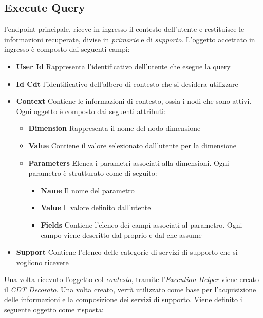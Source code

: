 \subsection{Execute Query\label{sec:execute-query-endpoint}}

\upe l'endpoint principale, riceve in ingresso il contesto dell'utente e restituisce le informazioni recuperate, divise in \emph{primarie} e di \emph{supporto}. L'oggetto accettato in ingresso è composto dai seguenti campi:

\begin{itemize}
	\item \textbf{User Id} Rappresenta l'identificativo dell'utente che esegue la query
	\item \textbf{Id Cdt} \upe l'identificativo dell'albero di contesto che si desidera utilizzare
	\item \textbf{Context} Contiene le informazioni di contesto, ossia i nodi che sono attivi. Ogni oggetto è composto dai seguenti attributi:
	\begin{itemize}
		\item \textbf{Dimension} Rappresenta il nome del nodo dimensione
		\item \textbf{Value} Contiene il valore selezionato dall'utente per la dimensione
		\item \textbf{Parameters} Elenca i parametri associati alla dimensioni. Ogni parametro è strutturato come di seguito:
		\begin{itemize}
			\item \textbf{Name} Il nome del parametro
			\item \textbf{Value} Il valore definito dall'utente
			\item \textbf{Fields} Contiene l'elenco dei campi associati al parametro. Ogni campo viene descritto dal proprio  e dal  che assume
		\end{itemize}
	\end{itemize}
	\item \textbf{Support} Contiene l'elenco delle categorie di servizi di supporto che si vogliono ricevere
\end{itemize}

Una volta ricevuto l'oggetto col \emph{contesto}, tramite l'\emph{Execution Helper} viene creato il \emph{CDT Decorato}. Una volta creato, verrà utilizzato come base per l'acquisizione delle informazioni e la composizione dei servizi di supporto. Viene definito il seguente oggetto come risposta:

